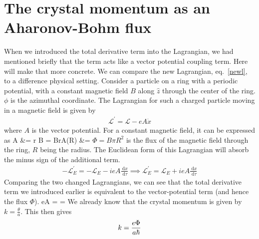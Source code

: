 \documentclass[12pt,onecolumn]{revtex4-2}
\begin{document}
\section{The crystal momentum as an Aharonov-Bohm flux}
When we introduced the total derivative term into the Lagrangian, we had mentioned briefly that the term acts like a vector potential coupling term. Here will make that more concrete. We can compare the new Lagrangian, eq.~\ref{newl}, to a difference physical setting. Consider a particle on a ring with a periodic potential, with a constant magnetic field \(B\) along \(\hat z\) through the center of the ring. \(\phi\) is the azimuthal coordinate. The Lagrangian for such a charged particle moving in a magnetic field is given by
\begin{equation}\begin{aligned}
	\mathcal{L}^\prime = \mathcal{L} - eA \dot x
\end{aligned}\end{equation}
where \(A\) is the vector potential. For a constant magnetic field, it can be expressed as
\beq
\vec A &= \vec r \times \vec B = Br\hat \phi \implies A(R) &= 
\eeq
\(\Phi = B\pi R^2\) is the flux of the magnetic field through the ring, \(R\) being the radius. 
The Euclidean form of this Lagrangian will absorb the minus sign of the additional term.
\begin{equation}\begin{aligned}
	-\mathcal{L}_E^\prime = -\mathcal{L}_E - ieA \frac{\:\mathrm{d}x}{\:\mathrm{d}\tau} \implies \mathcal{L}_E^\prime = \mathcal{L}_E + ieA \frac{\:\mathrm{d}x}{\:\mathrm{d}\tau}
\end{aligned}\end{equation}
Comparing the two changed Lagrangians, we can see that the total derivative term we introduced earlier is equivalent to the vector-potential term (and hence the flux \(\Phi\)).
\beq[sakura]
eA =  \implies \theta = 
\eeq
We already know that the crystal momentum is given by \(k = \frac{\theta}{a}\). This then gives
\begin{equation}\begin{aligned}
k = \frac{e\Phi}{a\hbar}
\end{aligned}\end{equation}
\end{document}
